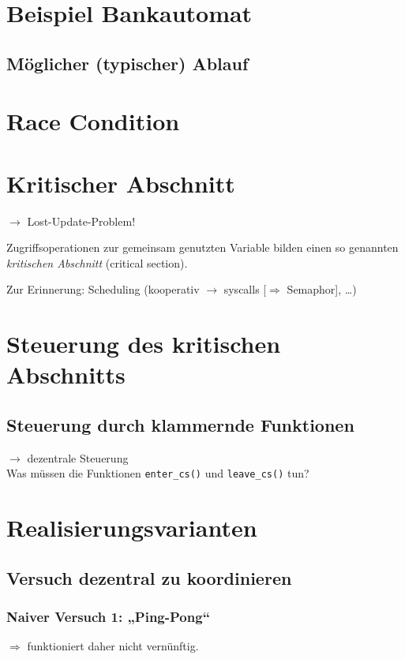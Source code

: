 \section{Beispiel Bankautomat}
\subsection*{Möglicher (typischer) Ablauf}
\section{Race Condition}
\section{Kritischer Abschnitt}
$\to$ Lost-Update-Problem!
\begin{framed}
Zugriffsoperationen zur gemeinsam genutzten Variable
bilden einen so genannten \emph{kritischen Abschnitt} (critical
section).
\end{framed}
Zur Erinnerung: Scheduling (kooperativ $\to$ syscalls [$\Rightarrow$ Semaphor], …)
\section{Steuerung des kritischen Abschnitts}
\subsection*{Steuerung durch klammernde Funktionen}
$\to$ dezentrale Steuerung\\
Was müssen die Funktionen \lstinline$enter_cs()$ und \lstinline$leave_cs()$ tun?
\section{Realisierungsvarianten}
\subsection{Versuch dezentral zu koordinieren}
\subsubsection{Naiver Versuch 1: „Ping-Pong“}
$\Rightarrow$ funktioniert daher nicht vernünftig.
